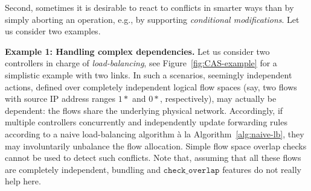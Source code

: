 \documentclass[conference]{sigcomm-alternate}
\newcommand{\checko}{\texttt{check\_overlap}\xspace}
\newcommand{\liron}[1]{\textit{\textcolor{mygreen}{[liron]: #1}}} %
\begin{document}

Second, sometimes it is desirable to react to conflicts in smarter ways than
by simply aborting an operation, e.g., by supporting \emph{conditional modifications}.
Let us consider two examples.

\vspace{2mm}
\noindent \textbf{Example 1: Handling complex dependencies.} Let us consider two controllers
in charge
of \emph{load-balancing}, see Figure~\ref{fig:CAS-example} 
for a simplistic example with two links. 
In such a scenarios, seemingly independent actions, defined over
completely independent logical flow spaces (say, two flows with source IP address ranges $1*$ and $0*$,
respectively),
may actually be dependent: the flows share the underlying physical network.
Accordingly, if multiple controllers concurrently and independently
update forwarding rules according to a naive load-balancing algorithm \`{a} la Algorithm~\ref{alg:naive-lb},
they may involuntarily
unbalance the flow allocation.
Simple flow space overlap checks cannot be used to detect
such conflicts.
Note that, assuming that all these flows are
completely independent, bundling and $\checko$ features do not really
help here.

\end{document}
